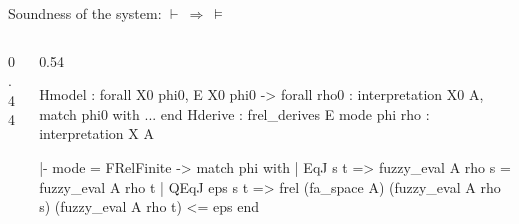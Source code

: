 \documentclass[10pt,aspectratio=169]{beamer}
\begin{document}
                \begin{frame}[fragile]{Soundness of the system:
                    $\vdash\ \Rightarrow\ \models$}
                    \begin{columns}[T]
                        \begin{column}{0.44\textwidth}
                        \end{column}
                        \begin{column}{0.54\textwidth}
                            \begin{goalbox}[title={Proof state}]
                                \begin{gctx}
Hmodel : forall X0 phi0, E X0 phi0 ->
  forall rho0 : interpretation X0 A,
    match phi0 with ... end
Hderive : frel_derives E mode phi
rho : interpretation X A
                                \end{gctx}
                                \tcblower
                                \begin{gconc}
|- mode = FRelFinite ->
   match phi with
   | EqJ s t => fuzzy_eval A rho s = fuzzy_eval A rho t
   | QEqJ eps s t =>
     frel (fa_space A) (fuzzy_eval A rho s) (fuzzy_eval A rho t) <= eps
   end
                                \end{gconc}
                            \end{goalbox}
                        \end{column}
                    \end{columns}
                \end{frame}
\end{document}
